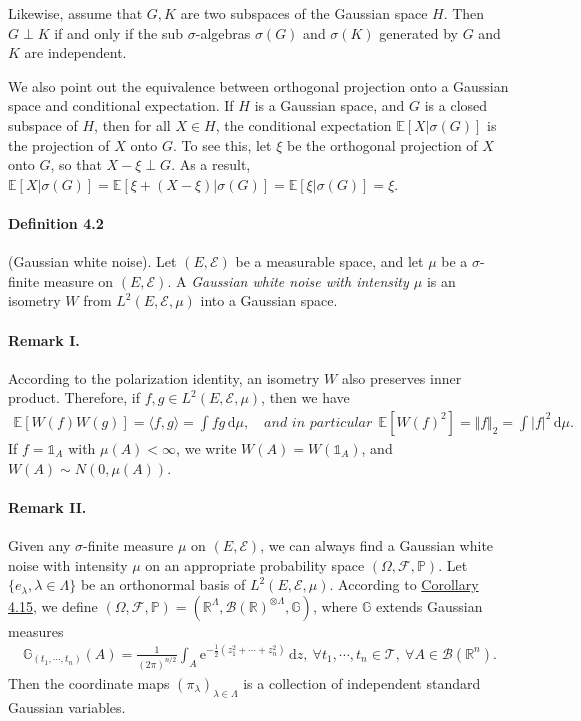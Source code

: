 \documentclass{article}
\numberwithin{equation}{section}
\newcommand{\e}{\mathrm{e}}
\newcommand{\E}{\mathbb{E}}
\renewcommand{\P}{\mathbb{P}}
\renewcommand{\d}{\mathrm{d}}
\theoremstyle{plain}
\theoremstyle{definition}
\begin{document}
Likewise, assume that $G,K$ are two subspaces of the Gaussian space $H$. Then $G\perp K$ if and only if the sub $\sigma$-algebras $\sigma(G)$ and $\sigma(K)$ generated by $G$ and $K$ are independent.

We also point out the equivalence between orthogonal projection onto a Gaussian space and conditional expectation. If $H$ is a Gaussian space, and $G$ is a closed subspace of $H$, then for all $X\in H$, the conditional expectation $\E[X|\sigma(G)]$ is the projection of $X$ onto $G$. To see this, let $\xi$ be the orthogonal projection of $X$ onto $G$, so that $X-\xi\perp G$. As a result, $\E[X|\sigma(G)]=\E[\xi + (X-\xi)|\sigma(G)] = \E[\xi|\sigma(G)] = \xi$.

\paragraph{Definition 4.2\label{def:4.2}} (Gaussian white noise). Let $(E,\mathscr{E})$ be a measurable space, and let $\mu$ be a $\sigma$-finite measure on $(E,\mathscr{E})$. A \textit{Gaussian white noise with intensity $\mu$} is an isometry $W$ from $L^2(E,\mathscr{E},\mu)$ into a Gaussian space.

\paragraph{Remark I.} According to the polarization identity, an isometry $W$ also preserves inner product. Therefore, if $f,g\in L^2(E,\mathscr{E},\mu)$, then we have
\begin{align*}
	\E[W(f)W(g)] = \langle f,g\rangle = \int fg\,\d \mu,\quad \textit{and in particular}\ \ \E[W(f)^2]=\Vert f\Vert_2 = \int \vert f\vert^2\,\d \mu.
\end{align*}
If $f=\mathds{1}_A$ with $\mu(A)<\infty$, we write $W(A)=W(\mathds{1}_A)$, and $W(A)\sim N(0,\mu(A))$.

\paragraph{Remark II.} Given any $\sigma$-finite measure $\mu$ on $(E,\mathscr{E})$, we can always find a Gaussian white noise with intensity $\mu$ on an appropriate probability space $(\Omega,\mathscr{F},\P)$. Let $\{e_\lambda,\lambda\in\Lambda\}$ be an orthonormal basis of $L^2(E,\mathscr{E},\mu)$. According to \hyperref[cor:4.15]{Corollary 4.15}, we define $(\Omega,\mathscr{F},\P)=(\mathbb{R}^\Lambda,\mathscr{B}(\mathbb{R})^{\otimes\Lambda},\mathbb{G})$, where $\mathbb{G}$ extends Gaussian measures
\begin{align*}
	\mathbb{G}_{(t_1,\cdots,t_n)}(A)=\frac{1}{(2\pi)^{n/2}}\int_A\e^{-\frac{1}{2}(z_1^2+\cdots+z_n^2)}\,\d z,\ \forall t_1,\cdots,t_n\in\mathcal{T},\ \forall A\in\mathscr{B}(\mathbb{R}^n).
\end{align*}
Then the coordinate maps $(\pi_\lambda)_{\lambda\in\Lambda}$ is a collection of independent standard Gaussian variables.
\end{document}
